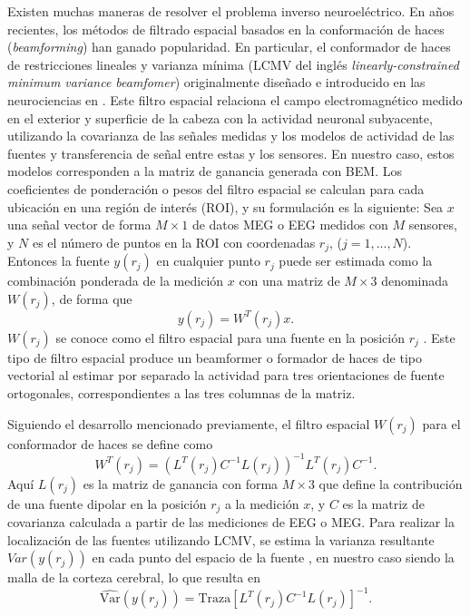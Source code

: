 Existen muchas maneras de resolver el problema inverso neuroeléctrico. En años recientes, los métodos de filtrado espacial basados en la conformación de haces (\emph{beamforming}) han ganado popularidad.
En particular, el conformador de haces de restricciones lineales y varianza mínima (LCMV del inglés \emph{linearly-constrained minimum variance beamfomer}) originalmente diseñado e introducido en las neurociencias en \cite{VanVeen1988, VanVeen1997}.
Este filtro espacial relaciona el campo electromagnético medido en el exterior y superficie de la cabeza con la actividad neuronal subyacente, utilizando la covarianza de las señales medidas y los modelos de actividad de las fuentes y transferencia de señal entre estas y los sensores. En nuestro caso, estos modelos corresponden a la matriz de ganancia generada con BEM.
Los coeficientes de ponderación o pesos del filtro espacial se calculan para cada ubicación en una región de interés (ROI), y su formulación es la siguiente: Sea $x$ una señal vector de forma $M \times 1$ de datos MEG o EEG medidos con $M$ sensores, y $N$ es el número de puntos en la ROI con coordenadas $r_j$, ($j = 1, ..., N$).
Entonces la fuente $y(r_j)$ en cualquier punto $r_j$ puede ser estimada como la combinación ponderada de la medición $x$ con una matriz de $M \times 3$ denominada $W(r_j)$, de forma que
\begin{equation}
	\label{beamformer}
	y(r_j) = W^{T}(r_j)x \text{.}
\end{equation}
$W(r_j)$ se conoce como el filtro espacial para una fuente en la posición $r_j$ \cite{VanVeen1997,Jaiswal2020}.
Este tipo de filtro espacial produce un beamformer o formador de haces de tipo vectorial al estimar por separado la actividad para tres orientaciones de fuente ortogonales, correspondientes a las tres columnas de la matriz.

Siguiendo el desarrollo mencionado previamente, el filtro espacial $W(r_j)$ para el conformador de haces se define como
\begin{equation}
	\label{beamformer2}
	W^{T}(r_j) = (L^{T}(r_j)C^{-1}L(r_j))^{-1}L^{T}(r_j)C^{-1} \text{.}
\end{equation}
Aquí $L(r_j)$ es la matriz de ganancia con forma $M \times 3$ que define la contribución de una fuente dipolar en la posición $r_j$ a la medición $x$, y $C$ es la matriz de covarianza calculada a partir de las mediciones de EEG o MEG.
Para realizar la localización de las fuentes utilizando LCMV, se estima la varianza resultante $Var(y(r_j))$ en cada punto del espacio de la fuente \cite{VanVeen1997,Jaiswal2020}, en nuestro caso siendo la malla de la corteza cerebral, lo que resulta en
\begin{equation}
	\label{beamformer3}
	\widehat{\text{Var}}(y(r_j)) = \text{Traza}[L^{T}(r_j)C^{-1}L(r_j)]^{-1}.
\end{equation}

